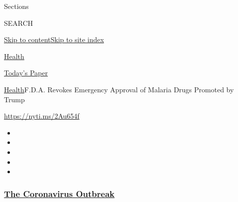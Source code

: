 Sections

SEARCH

\protect\hyperlink{site-content}{Skip to
content}\protect\hyperlink{site-index}{Skip to site index}

\href{https://www.nytimes3xbfgragh.onion/section/health}{Health}

\href{https://myaccount.nytimes3xbfgragh.onion/auth/login?response_type=cookie\&client_id=vi}{}

\href{https://www.nytimes3xbfgragh.onion/section/todayspaper}{Today's
Paper}

\href{/section/health}{Health}\textbar{}F.D.A. Revokes Emergency
Approval of Malaria Drugs Promoted by Trump

\url{https://nyti.ms/2Au654f}

\begin{itemize}
\item
\item
\item
\item
\item
\end{itemize}

\hypertarget{the-coronavirus-outbreak}{%
\subsubsection{\texorpdfstring{\href{https://www.nytimes3xbfgragh.onion/news-event/coronavirus?name=styln-coronavirus-national\&region=TOP_BANNER\&block=storyline_menu_recirc\&action=click\&pgtype=Article\&impression_id=f2205f50-f52e-11ea-9322-a3eb5bc47b4b\&variant=undefined}{The
Coronavirus
Outbreak}}{The Coronavirus Outbreak}}\label{the-coronavirus-outbreak}}

